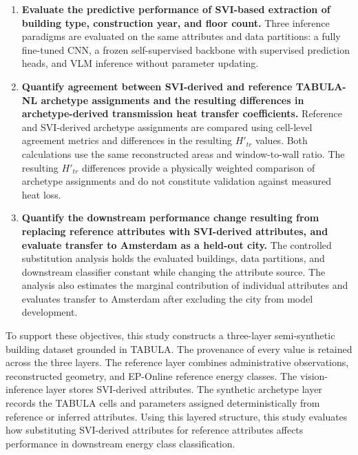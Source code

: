 \begin{enumerate}
	\item \textbf{Evaluate the predictive performance of \ac{SVI}-based extraction of building type, construction year, and floor count.}
	      Three inference paradigms are evaluated on the same attributes and data partitions: a fully fine-tuned \acf{CNN}, a frozen self-supervised backbone with supervised prediction heads, and \ac{VLM} inference without parameter updating.

	\item \textbf{Quantify agreement between \ac{SVI}-derived and reference TABULA-NL archetype assignments and the resulting differences in archetype-derived transmission heat transfer coefficients.}
	      Reference and \ac{SVI}-derived archetype assignments are compared using cell-level agreement metrics and differences in the resulting $H'_{tr}$ values.
	      Both calculations use the same reconstructed areas and window-to-wall ratio.
	      The resulting $H'_{tr}$ differences provide a physically weighted comparison of archetype assignments and do not constitute validation against measured heat loss.

	\item \textbf{Quantify the downstream performance change resulting from replacing reference attributes with \ac{SVI}-derived attributes, and evaluate transfer to Amsterdam as a held-out city.}
	      The controlled substitution analysis holds the evaluated buildings, data partitions, and downstream classifier constant while changing the attribute source.
	      The analysis also estimates the marginal contribution of individual attributes and evaluates transfer to Amsterdam after excluding the city from model development.
\end{enumerate}

To support these objectives, this study constructs a three-layer semi-synthetic building dataset grounded in TABULA. The provenance of every value is retained across the three layers. The reference layer combines administrative observations, reconstructed geometry, and EP-Online reference energy classes. The vision-inference layer stores \ac{SVI}-derived attributes. The synthetic archetype layer records the TABULA cells and parameters assigned deterministically from reference or inferred attributes. Using this layered structure, this study evaluates how substituting \ac{SVI}-derived attributes for reference attributes affects performance in downstream energy class classification.
